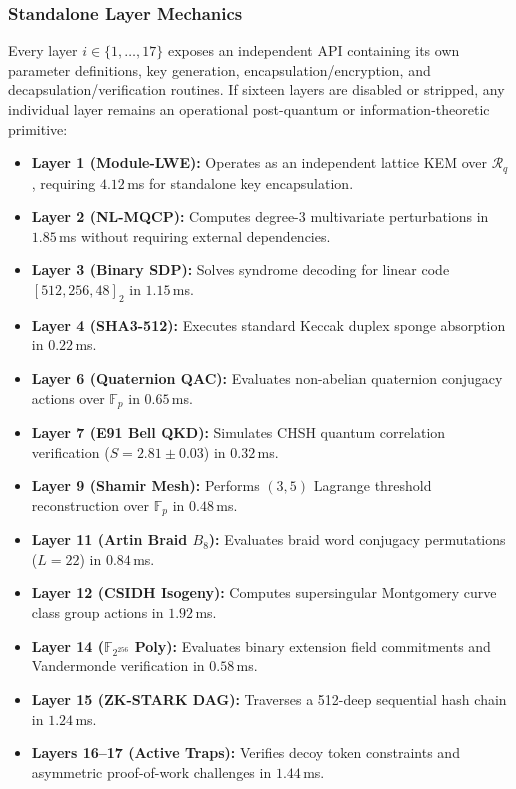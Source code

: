 \documentclass{ieeeaccess}
\newcommand{\F}{\mathbb{F}}
\newcommand{\calR}{\mathcal{R}}
\begin{document}
\subsubsection{Standalone Layer Mechanics}
Every layer $i \in \{1, \dots, 17\}$ exposes an independent API containing its own parameter definitions, key generation, encapsulation/encryption, and decapsulation/verification routines. If sixteen layers are disabled or stripped, any individual layer remains an operational post-quantum or information-theoretic primitive:
\begin{itemize}
  \item \textbf{Layer 1 (Module-LWE):} Operates as an independent lattice KEM over $\calR_q$, requiring $4.12$\,ms for standalone key encapsulation.
  \item \textbf{Layer 2 (NL-MQCP):} Computes degree-3 multivariate perturbations in $1.85$\,ms without requiring external dependencies.
  \item \textbf{Layer 3 (Binary SDP):} Solves syndrome decoding for linear code $[512, 256, 48]_2$ in $1.15$\,ms.
  \item \textbf{Layer 4 (SHA3-512):} Executes standard Keccak duplex sponge absorption in $0.22$\,ms.
  \item \textbf{Layer 6 (Quaternion QAC):} Evaluates non-abelian quaternion conjugacy actions over $\F_p$ in $0.65$\,ms.
  \item \textbf{Layer 7 (E91 Bell QKD):} Simulates CHSH quantum correlation verification ($S = 2.81 \pm 0.03$) in $0.32$\,ms.
  \item \textbf{Layer 9 (Shamir Mesh):} Performs $(3,5)$ Lagrange threshold reconstruction over $\F_p$ in $0.48$\,ms.
  \item \textbf{Layer 11 (Artin Braid $B_8$):} Evaluates braid word conjugacy permutations ($L=22$) in $0.84$\,ms.
  \item \textbf{Layer 12 (CSIDH Isogeny):} Computes supersingular Montgomery curve class group actions in $1.92$\,ms.
  \item \textbf{Layer 14 ($\F_{2^{256}}$ Poly):} Evaluates binary extension field commitments and Vandermonde verification in $0.58$\,ms.
  \item \textbf{Layer 15 (ZK-STARK DAG):} Traverses a 512-deep sequential hash chain in $1.24$\,ms.
  \item \textbf{Layers 16--17 (Active Traps):} Verifies decoy token constraints and asymmetric proof-of-work challenges in $1.44$\,ms.
\end{itemize}
\end{document}
